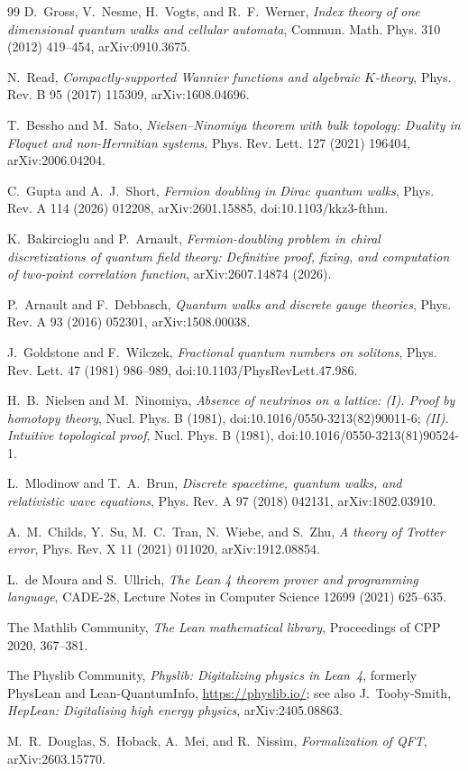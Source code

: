 \documentclass[11pt]{article}
\begin{document}
\begin{thebibliography}{99}
D.~Gross, V.~Nesme, H.~Vogts, and R.~F.~Werner,
\emph{Index theory of one dimensional quantum walks and cellular automata},
Commun. Math. Phys. 310 (2012) 419--454, arXiv:0910.3675.

N.~Read,
\emph{Compactly-supported Wannier functions and algebraic $K$-theory},
Phys. Rev. B 95 (2017) 115309, arXiv:1608.04696.

T.~Bessho and M.~Sato,
\emph{Nielsen--Ninomiya theorem with bulk topology: Duality in Floquet and
non-Hermitian systems}, Phys. Rev. Lett. 127 (2021) 196404,
arXiv:2006.04204.

C.~Gupta and A.~J.~Short,
\emph{Fermion doubling in Dirac quantum walks},
Phys. Rev. A 114 (2026) 012208, arXiv:2601.15885,
doi:10.1103/kkz3-fthm.

K.~Bakircioglu and P.~Arnault,
\emph{Fermion-doubling problem in chiral discretizations of quantum field
theory: Definitive proof, fixing, and computation of two-point correlation
function}, arXiv:2607.14874 (2026).

P.~Arnault and F.~Debbasch,
\emph{Quantum walks and discrete gauge theories},
Phys. Rev. A 93 (2016) 052301, arXiv:1508.00038.

J.~Goldstone and F.~Wilczek,
\emph{Fractional quantum numbers on solitons},
Phys. Rev. Lett. 47 (1981) 986--989,
doi:10.1103/PhysRevLett.47.986.

H.~B.~Nielsen and M.~Ninomiya,
\emph{Absence of neutrinos on a lattice: (I). Proof by homotopy theory},
Nucl. Phys. B (1981), doi:10.1016/0550-3213(82)90011-6;
\emph{(II). Intuitive topological proof},
Nucl. Phys. B (1981), doi:10.1016/0550-3213(81)90524-1.

L.~Mlodinow and T.~A.~Brun,
\emph{Discrete spacetime, quantum walks, and relativistic wave equations},
Phys. Rev. A 97 (2018) 042131, arXiv:1802.03910.

A.~M.~Childs, Y.~Su, M.~C.~Tran, N.~Wiebe, and S.~Zhu,
\emph{A theory of Trotter error}, Phys. Rev. X 11 (2021) 011020,
arXiv:1912.08854.

L.~de Moura and S.~Ullrich,
\emph{The Lean 4 theorem prover and programming language},
CADE-28, Lecture Notes in Computer Science 12699 (2021) 625--635.

The Mathlib Community,
\emph{The Lean mathematical library}, Proceedings of CPP 2020, 367--381.

The Physlib Community,
\emph{Physlib: Digitalizing physics in Lean~4}, formerly PhysLean and
Lean-QuantumInfo, \url{https://physlib.io/}; see also J.~Tooby-Smith,
\emph{HepLean: Digitalising high energy physics}, arXiv:2405.08863.

M.~R.~Douglas, S.~Hoback, A.~Mei, and R.~Nissim,
\emph{Formalization of QFT}, arXiv:2603.15770.

\end{thebibliography}
\end{document}
